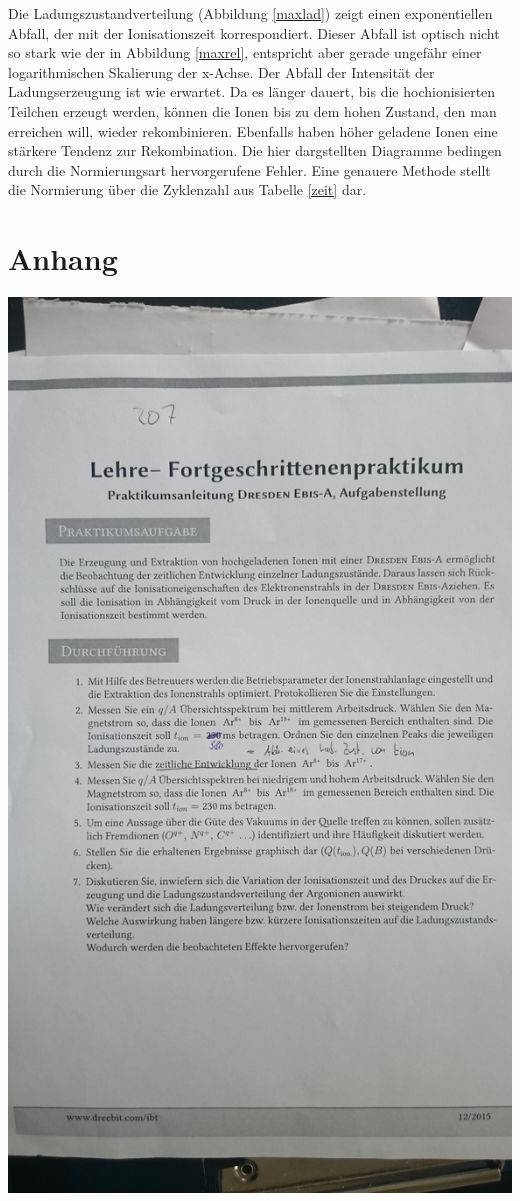     Die Ladungszustandverteilung (Abbildung \ref{maxlad}) zeigt einen exponentiellen Abfall, der mit der Ionisationszeit korrespondiert. Dieser Abfall ist optisch nicht so stark wie der in Abbildung \ref{maxrel}, entspricht aber gerade ungefähr einer logarithmischen Skalierung der x-Achse. Der Abfall der Intensität der Ladungserzeugung ist wie erwartet. Da es länger dauert, bis die hochionisierten Teilchen erzeugt werden, können die Ionen bis zu dem hohen Zustand, den man erreichen will, wieder rekombinieren. Ebenfalls haben höher geladene Ionen eine stärkere Tendenz zur Rekombination.
    Die hier dargstellten Diagramme bedingen durch die Normierungsart hervorgerufene Fehler. Eine genauere Methode stellt die Normierung über die Zyklenzahl aus Tabelle \ref{zeit} dar.

\section{Anhang}
    \centering
    \includegraphics[scale=0.14]{../Mitschriften/DSC_0095.JPG}\\ \newpage
